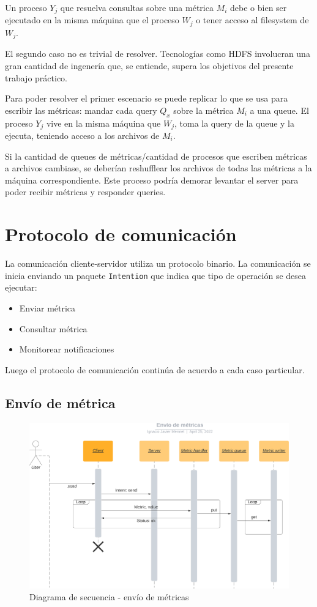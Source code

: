 \documentclass[a4paper,oneside]{article}
\begin{document}
Un proceso $Y_j$ que resuelva consultas sobre una métrica $M_i$ debe o bien ser ejecutado en la misma máquina que el proceso $W_j$ o tener acceso al filesystem de $W_j$.

El segundo caso no es trivial de resolver. Tecnologías como HDFS\cite{HDFS} involucran una gran cantidad de ingenería que, se entiende, supera los objetivos del presente trabajo práctico.

Para poder resolver el primer escenario se puede replicar lo que se usa para escribir las métricas: mandar cada query $Q_x$ sobre la métrica $M_i$ a una queue. El proceso $Y_j$ vive en la misma máquina que $W_j$, toma la query de la queue y la ejecuta, teniendo acceso a los archivos de $M_i$.

Si la cantidad de queues de métricas/cantidad de procesos que escriben métricas a archivos cambiase, se deberían reshufflear los archivos de todas las métricas a la máquina correspondiente. Este proceso podría demorar levantar el server para poder recibir métricas y responder queries.


\section{Protocolo de comunicación}
La comunicación cliente-servidor utiliza un protocolo binario. La comunicación se inicia enviando un paquete \texttt{Intention}\cite{IntentionPackage} que indica que tipo de operación se desea ejecutar:
\begin{itemize}
	\item Enviar métrica
	\item Consultar métrica
	\item Monitorear notificaciones
\end{itemize}

Luego el protocolo de comunicación continúa de acuerdo a cada caso particular.

\subsection{Envío de métrica}
\begin{figure}[H]
\centering
\includegraphics[width=\textwidth]{images/envio_metricas.png}
\caption{Diagrama de secuencia - envío de métricas}
\end{figure}
\end{document}
